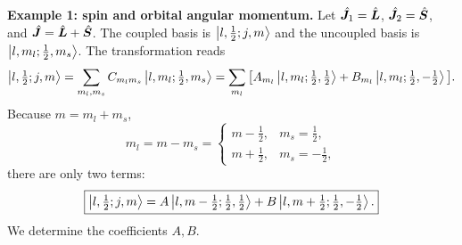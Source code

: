 \textbf{Example 1: spin and orbital angular momentum.} Let $\hat{\bm{J}}_1=\hat{\bm{L}}$, $\hat{\bm{J}}_2=\hat{\bm{S}}$, and $\hat{\bm{J}}=\hat{\bm{L}}+\hat{\bm{S}}$. The coupled basis is $\left|l,\tfrac12;j,m\right\rangle$ and the uncoupled basis is $\left|l,m_l;\tfrac12,m_s\right\rangle$.
The transformation reads
\begin{equation}
\left|l,\tfrac12;j,m\right\rangle
=\sum_{m_l,m_s}C_{m_lm_s}\left|l,m_l;\tfrac12,m_s\right\rangle
=\sum_{m_l}\big[A_{m_l}\left|l,m_l;\tfrac12,\tfrac12\right\rangle
+B_{m_l}\left|l,m_l;\tfrac12,-\tfrac12\right\rangle\big].
\end{equation}
Because $m=m_l+m_s$,
\begin{equation}
m_l=m-m_s=\begin{cases}
m-\frac12,&m_s=\frac12,\\
m+\frac12,&m_s=-\frac12,
\end{cases}
\end{equation}
there are only two terms:
\begin{equation}
\boxed{\left|l,\tfrac12;j,m\right\rangle
=A\left|l,m-\tfrac12;\tfrac12,\tfrac12\right\rangle
+B\left|l,m+\tfrac12;\tfrac12,-\tfrac12\right\rangle.}
\end{equation}
We determine the coefficients $A,B$.

